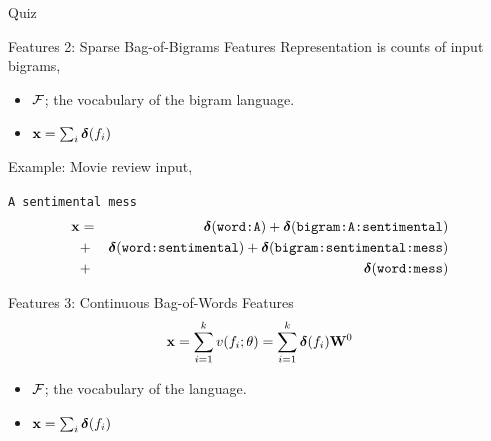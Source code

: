 \documentclass{beamer}
\begin{document}
\begin{frame}{Quiz}
\begin{itemize}
\begin{frame}{Features 2: Sparse Bag-of-Bigrams Features}
  Representation is counts of input bigrams, 
  \begin{itemize}
  \item $\mathcal{F}$; the vocabulary of the bigram language.
  \item $\mathbf{x} = \sum_{i} \boldsymbol{\delta}(f_i)$ 
  \end{itemize}

  Example: Movie review input, 
  \begin{center}
    \texttt{A sentimental mess}
    \begin{eqnarray*}
      \mathbf{x} &=& \boldsymbol{\delta}(\texttt{word:A})+ \boldsymbol{\delta}(\texttt{bigram:A:sentimental}) \\
      &+&  \boldsymbol{\delta}(\texttt{word:sentimental}) +   \boldsymbol{\delta}(\texttt{bigram:sentimental:mess})  \\
      &+& \boldsymbol{\delta}(\texttt{word:mess})
    \end{eqnarray*}

    
  \end{center}
\end{frame}




\begin{frame}{Features 3: Continuous Bag-of-Words Features}
  \[ \mathbf{x} = \sum_{i=1}^{k} v(f_i; \theta) = \sum_{i=1}^{k} \boldsymbol{\delta}(f_i) \mathbf{W}^0\]

  \begin{itemize}
  \item $\mathcal{F}$; the vocabulary of the language.
  \item $\mathbf{x} = \sum_{i} \boldsymbol{\delta}(f_i)$ 
  \end{itemize}


\end{frame}
\end{itemize}
\end{frame}
\end{document}
